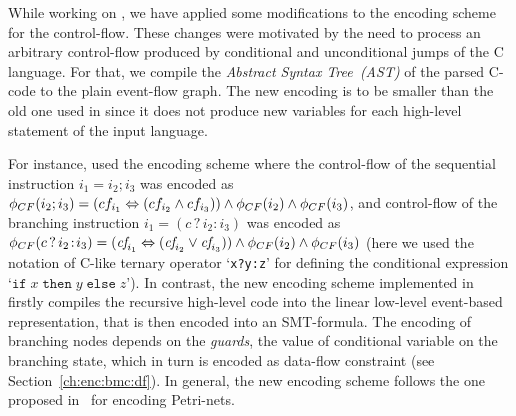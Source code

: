 While working on \porthos[2], we have applied some modifications to the encoding scheme for the control-flow.
These changes were motivated by the need to process an arbitrary control-flow produced by conditional and unconditional jumps of the C language.
For that, we compile the \textit{Abstract Syntax Tree~(AST)} of the parsed C-code to the plain event-flow graph.
The new encoding is to be smaller than the old one used in \porthos{} since it does not produce new variables for each high-level statement of the input language.

For instance, \porthos[1] used the encoding scheme where the control-flow of the sequential instruction $i_1 = i_2; i_3$ was encoded as
$\phi_{CF}(i_2;i_3) = (cf_{i_1} \Leftrightarrow (cf_{i_2} \land cf_{i_3})) \land \phi_{CF}(i_2) \land \phi_{CF}(i_3)$,
and control-flow of the branching instruction $i_1 = (c\,?\,i_2\!:\!i_3)$ was encoded as
$\phi_{CF}(c\,?\,i_2\!:\!i_3) = (\textit{cf}_{i_1} \Leftrightarrow (\textit{cf}_{i_2} \lor \textit{cf}_{i_3})) \land \phi_{CF}(i_2) \land \phi_{CF}(i_3)$
(here we used the notation of C-like ternary operator `\texttt{x?y:z}' for defining the conditional expression `$\texttt{if}\;x\;\texttt{then}\;y\;\texttt{else}\;z$').
In contrast, the new encoding scheme implemented in \porthos[2] firstly compiles the recursive high-level code into the linear low-level event-based representation, that is then encoded into an SMT-formula. The encoding of branching nodes depends on the \textit{guards}, the value of conditional variable on the branching state, which in turn is encoded as data-flow constraint (see Section~\ref{ch:enc:bmc:df}).
In general, the new encoding scheme follows the one proposed in~\cite[Chapter 5.1.2]{heljanko2008unfoldings} for encoding Petri-nets.


